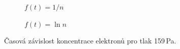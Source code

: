 \documentclass[a4paper,12pt]{article}
\begin{document}
\begin{figure}[h]
	\centering
	\begin{subfigure}[b]{.49\linewidth}
		\centering
		\caption{$f(t) = 1/n$}
	\end{subfigure}
	\begin{subfigure}[b]{.49\linewidth}
		\centering
		\caption{$f(t) = \ln n$}
	\end{subfigure}
	\caption{Časová závislost koncentrace elektronů pro tlak 159\,Pa.}
	\label{g:100Pa}
\end{figure}
\end{document}
